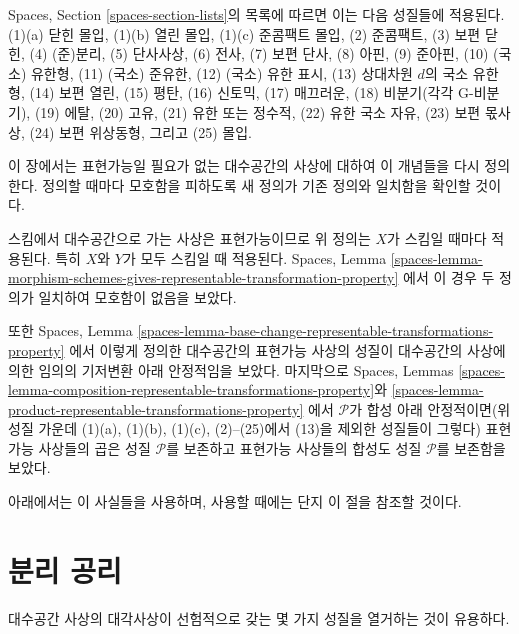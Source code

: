 \medskip\noindent
Spaces, Section \ref{spaces-section-lists}의 목록에 따르면 이는
다음 성질들에 적용된다.
(1)(a) 닫힌 몰입,
(1)(b) 열린 몰입,
(1)(c) 준콤팩트 몰입,
(2) 준콤팩트,
(3) 보편 닫힌,
(4) (준)분리,
(5) 단사사상,
(6) 전사,
(7) 보편 단사,
(8) 아핀,
(9) 준아핀,
(10) (국소) 유한형,
(11) (국소) 준유한,
(12) (국소) 유한 표시,
(13) 상대차원 $d$의 국소 유한형,
(14) 보편 열린,
(15) 평탄,
(16) 신토믹,
(17) 매끄러운,
(18) 비분기(각각 G-비분기),
(19) 에탈,
(20) 고유,
(21) 유한 또는 정수적,
(22) 유한 국소 자유,
(23) 보편 몫사상,
(24) 보편 위상동형, 그리고
(25) 몰입.

\medskip\noindent
이 장에서는 표현가능일 필요가 없는 대수공간의 사상에 대하여 이 개념들을
다시 정의한다. 정의할 때마다 모호함을 피하도록 새 정의가 기존 정의와
일치함을 확인할 것이다.

\medskip\noindent
스킴에서 대수공간으로 가는 사상은 표현가능이므로 위 정의는 $X$가 스킴일
때마다 적용된다. 특히 $X$와 $Y$가 모두 스킴일 때 적용된다.
Spaces, Lemma
\ref{spaces-lemma-morphism-schemes-gives-representable-transformation-property}
에서 이 경우 두 정의가 일치하여 모호함이 없음을 보았다.

\medskip\noindent
또한 Spaces, Lemma
\ref{spaces-lemma-base-change-representable-transformations-property}
에서 이렇게 정의한 대수공간의 표현가능 사상의 성질이 대수공간의
사상에 의한 임의의 기저변환 아래 안정적임을 보았다.
마지막으로 Spaces, Lemmas
\ref{spaces-lemma-composition-representable-transformations-property}와
\ref{spaces-lemma-product-representable-transformations-property}
에서 $\mathcal{P}$가 합성 아래 안정적이면(위 성질 가운데
(1)(a), (1)(b), (1)(c), (2)--(25)에서 (13)을 제외한 성질들이 그렇다)
표현가능 사상들의 곱은 성질 $\mathcal{P}$를 보존하고
표현가능 사상들의 합성도 성질 $\mathcal{P}$를 보존함을 보았다.

\medskip\noindent
아래에서는 이 사실들을 사용하며, 사용할 때에는 단지 이 절을
참조할 것이다.















\section{분리 공리}
\label{section-separation-axioms}

\noindent
대수공간 사상의 대각사상이 선험적으로 갖는 몇 가지 성질을
열거하는 것이 유용하다.

